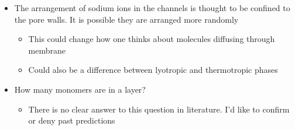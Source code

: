 \documentclass{article}
\begin{document}
	\begin{itemize}
		\item The arrangement of sodium ions in the channels is thought to be confined to the pore walls. It is possible they are arranged more randomly
		\begin{itemize}
			\item This could change how one thinks about molecules diffusing through membrane
			\item Could also be a difference between lyotropic and thermotropic phases
		\end{itemize}
		\item How many monomers are in a layer?
		\begin{itemize}
			\item There is no clear answer to this question in literature. I'd like to confirm or deny past predictions
		\end{itemize}
	\end{itemize}
	
\end{document}
